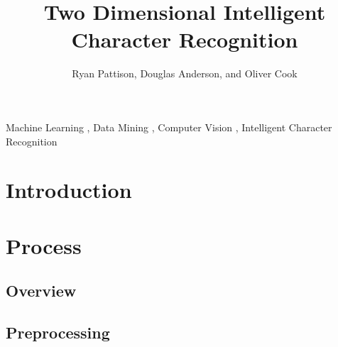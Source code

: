 \documentclass[preprint,3p,12pt]{elsarticle}
\begin{document}
\begin{frontmatter}

\title{Two Dimensional Intelligent Character Recognition}


\author[ryan,doug,oliver]{Ryan Pattison, Douglas Anderson, and Oliver Cook}
\address[ryan]{ryan.m.pattison@gmail.com}
\address[doug]{dander01@uoguelph.ca}
\address[oliver]{cooko@uoguelph.ca}


\begin{abstract}



\end{abstract}

\begin{keyword}
Machine Learning \sep
Data Mining \sep
Computer Vision \sep
Intelligent Character Recognition


\end{keyword}

\end{frontmatter}


\section{Introduction}
\label{intro}



\section{Process}
\label{process}

\subsection{Overview}
\label{process:overview}



\subsection{Preprocessing}
\label{process:preprocessing}
\end{document}
